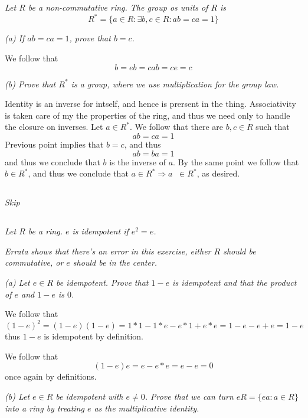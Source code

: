 \documentclass[11pt,oneside,titlepage]{book}
\DeclareMathOperator \inv {^{-1}}
\DeclareMathOperator \ra {\Rightarrow}
\newcommand{\set}[1]{\{ #1 \}}
\begin{document}
\subsection{}

\textit{Let $R$ be a non-commutative ring. The group os units of $R$ is
  $$R^* = \set{a \in R: \exists b, c \in R: ab = ca = 1}$$}

\textit{(a) If $ab = ca = 1$, prove that $b = c$.}

We follow that
$$b = e b = c a b  = c e = c$$

\textit{(b) Prove that $R^*$ is a group, where we use multiplication
  for the group law.}

Identity is an inverse for intself, and hence is prersent in the
thing.  Associativity is taken care of my the properties of the ring,
and thus we need only to handle the closure on inverses.  Let $a \in
R^*$. We follow that there are $b, c \in R$ such that
$$ab = ca = 1$$
Previous point implies that $b = c$, and thus
$$ab = ba = 1$$
and thus we conclude that $b$ is the inverse of $a$. By the same point
we follow that $b \in R^*$, and thus we conclude that $a \in R^* \ra
a\inv \in R^*$, as desired.

\subsection{}

\textit{Skip}

\subsection{}

\textit{Let $R$ be a ring. $e$ is idempotent if $e^2 = e$.}

\textit{Errata shows that there's an error in this exercise, either
  $R$ should be commutative, or $e$ should be in the center.}

\textit{(a) Let $e \in R$ be idempotent. Prove that $1 - e$ is idempotent and
  that the product of $e$ and $1 - e$ is $0$.}

We follow that
$$(1 - e)^2 = (1 - e)(1 - e) = 1 * 1 - 1 * e - e * 1 + e * e =
1 - e - e  + e = 1 - e$$
thus $1 - e$ is idempotent by definition.

We follow that
$$(1 - e) e = e - e * e = e - e = 0$$
once again by definitions.

\textit{(b) Let $e \in R$ be idempotent with $e \neq 0$. Prove that we
can turn $eR = \set{ea: a \in R}$ into a ring by treating $e$ as the
multiplicative identity.}
\end{document}
